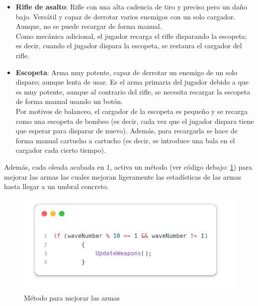 \documentclass[11pt]{article}
\begin{document}
            \begin{itemize}
            
                \item \textbf{Rifle de asalto}: Rifle con una alta cadencia de tiro y preciso pero un daño bajo. Versátil y capaz de derrotar varios enemigos con un solo cargador.\\ 
                Aunque, no se puede recargar de forma manual.\\ 
                Como mecánica adicional, el jugador recarga el rifle disparando la escopeta; es decir, cuando el jugador dispara la escopeta, se restaura el cargador del rifle.\\
                
                \item \textbf{Escopeta}: Arma muy potente, capaz de derrotar un enemigo de un solo disparo; aunque lenta de usar. Es el arma primaria del jugador debido a que es muy potente, aunque al contrario del rifle, se necesita recargar la escopeta de forma manual usando un botón.\\ 
                Por motivos de balanceo, el cargador de la escopeta es pequeño y se recarga como una escopeta de bombeo (es decir, cada vez que el jugador dispara tiene que esperar para disparar de nuevo). Además, para recargarla se hace de forma manual cartucho a cartucho (es decir, se introduce una bala en el cargador cada cierto tiempo).\\

            \end{itemize}

        
        Además, cada oleada acabada en 1, activa un método (ver código debajo: \ref{fig:waveacabada1}) para mejorar las armas las cuales mejoran ligeramente las estadísticas de las armas hasta llegar a un umbral concreto. \\ 
        
        \begin{figure}[H]
            \centering
            \includegraphics[width=\textwidth]{Images/Menuprincipal/wavnumber.png}
            \caption{Método para mejorar las armas}
            \label{fig:waveacabada1}
        \end{figure}
\end{document}
